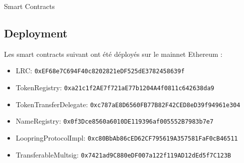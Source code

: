 \documentclass[UTF8,nofonts]{article}
\makeatletter
\newenvironment{figurehere}
 {\def\@captype{figure}}
 {}
\makeatother
\begin{document}
\begin{appendices}
\begin{center}
\begin{figurehere}
\caption{Smart Contracts}
\label{fig:smartcontracts}
\end{figurehere}
\end{center}

\subsection{Deployment}

Les smart contracts suivant ont été déployés sur le mainnet Ethereum :
\begin{itemize}
\item LRC: \verb|0xEF68e7C694F40c8202821eDF525dE3782458639f|
\item TokenRegistry: \verb|0xa21c1f2AE7f721aE77b1204A4f0811c642638da9|
\item TokenTransferDelegate: \verb|0xc787aE8D6560FB77B82F42CED8eD39f94961e304|
\item NameRegistry: \verb|0x0f3Dce8560a6010DE119396af005552B7983b7e7|
\item LoopringProtocolImpl: \verb|0xc80BbAb86cED62CF795619A357581FaF0cB46511|
\item TransferableMultsig: \verb|0x7421ad9C880eDF007a122f119AD12dEd5f7C123B|
\end{itemize}

\end{appendices}
\end{document}
